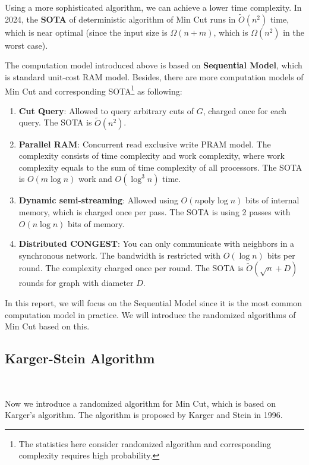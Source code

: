 \documentclass[11pt]{article}
\theoremstyle{plain}
\begin{document}
Using a more sophisticated algorithm, we can achieve a lower time complexity. In 2024, the \textbf{SOTA}\cite{doi:10.1137/1.9781611977912.111} of deterministic algorithm of Min Cut runs in $\tilde{O}(n^2)$ time, which is near optimal (since the input size is $\Omega(n+m)$, which is $\Omega(n^2)$ in the worst case).

The computation model introduced above is based on \textbf{Sequential Model}, which is standard unit-cost RAM model. Besides, there are more computation models of Min Cut and corresponding SOTA\footnote{The statistics here consider randomized algorithm and corresponding complexity requires high probability.} as following:
\begin{enumerate}
    \item \textbf{Cut Query}: Allowed to query arbitrary cuts of $G$, charged once for each query. The SOTA is $\tilde{O}(n^2)$\cite{mukhopadhyay2020weighted}.
    \item \textbf{Parallel RAM}: Concurrent read exclusive write PRAM model. The complexity consists of time complexity and work complexity, where work complexity equals to the sum of time complexity of all processors. The SOTA is $O(m\log n)$ work and $O(\log^3 n)$ time\cite{anderson2023parallel}.
    \item \textbf{Dynamic semi-streaming}: Allowed using $O(n\text{poly}\log n)$ bits of internal memory, which is charged once per pass. The SOTA is using 2 passes with $O(n\log n)$ bits of memory\cite{assadi2021simple}.
    \item \textbf{Distributed CONGEST}: You can only communicate with neighbors in a synchronous network. The bandwidth is restricted with $O(\log n)$ bits per round. The complexity charged once per round. The SOTA is $\tilde{O}(\sqrt{n}+D)$ rounds for graph with diameter $D$\cite{dory2021distributed}.
\end{enumerate}

In this report, we will focus on the Sequential Model since it is the most common computation model in practice. We will introduce the randomized algorithms of Min Cut based on this.

\subsection{Karger-Stein Algorithm}\

Now we introduce a randomized algorithm for Min Cut, which is based on Karger's algorithm\cite{inproceedings}. The algorithm is proposed by Karger and Stein in 1996\cite{karger1996new}.
\end{document}
